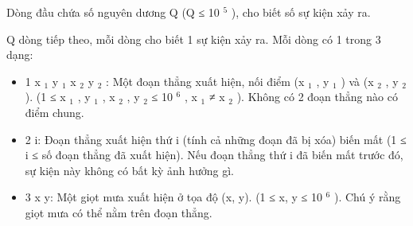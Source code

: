Dòng đầu chứa số nguyên dương Q (Q ≤ 10 $^ 5 $ ), cho biết số sự kiện xảy ra.

Q dòng tiếp theo, mỗi dòng cho biết 1 sự kiện xảy ra. Mỗi dòng có 1 trong 3 dạng:
\begin{itemize}
	\item 1 x $_ 1 $ y $_ 1 $ x $_ 2 $ y $_ 2 $ : Một đoạn thẳng xuất hiện, nối điểm (x $_ 1 $ , y $_ 1 $ ) và (x $_ 2 $ , y $_ 2 $ ). (1 ≤ x $_ 1 $ , y $_ 1 $ , x $_ 2 $ , y $_ 2 $ ≤ 10 $^ 6 $ , x $_ 1 $ ≠ x $_ 2 $ ). Không có 2 đoạn thẳng nào có điểm chung.
	\item 2 i: Đoạn thẳng xuất hiện thứ i (tính cả những đoạn đã bị xóa) biến mất (1 ≤ i ≤ số đoạn thẳng đã xuất hiện). Nếu đoạn thẳng thứ i đã biến mất trước đó, sự kiện này không có bất kỳ ảnh hưởng gì.
	\item 3 x y: Một giọt mưa xuất hiện ở tọa độ (x, y). (1 ≤ x, y ≤ 10 $^ 6 $ ). Chú ý rằng giọt mưa có thể nằm trên đoạn thẳng.
\end{itemize}
